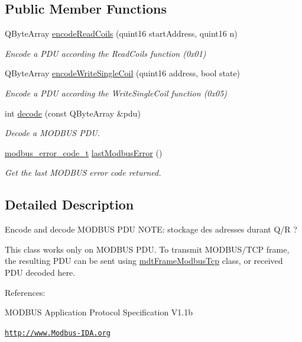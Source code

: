 \subsection*{Public Member Functions}
\begin{DoxyCompactItemize}
\item 
QByteArray \hyperlink{classmdt_frame_codec_modbus_adf0a4d583aeff7b818dda94514c594f0}{encodeReadCoils} (quint16 startAddress, quint16 n)
\begin{DoxyCompactList}\small\item\em Encode a PDU according the ReadCoils function (0x01) \end{DoxyCompactList}\item 
QByteArray \hyperlink{classmdt_frame_codec_modbus_a123f63422bb34fcb10ac653c0e89e79e}{encodeWriteSingleCoil} (quint16 address, bool state)
\begin{DoxyCompactList}\small\item\em Encode a PDU according the WriteSingleCoil function (0x05) \end{DoxyCompactList}\item 
int \hyperlink{classmdt_frame_codec_modbus_a426f465363a49d70890a462b40677787}{decode} (const QByteArray \&pdu)
\begin{DoxyCompactList}\small\item\em Decode a MODBUS PDU. \end{DoxyCompactList}\item 
\hyperlink{classmdt_frame_codec_modbus_a31d8291be7f8636d5d295ce3066d7ac7}{modbus\_\-error\_\-code\_\-t} \hyperlink{classmdt_frame_codec_modbus_a21f3102e12f1a1d9c4145c1ce1f8e6b6}{lastModbusError} ()
\begin{DoxyCompactList}\small\item\em Get the last MODBUS error code returned. \end{DoxyCompactList}\end{DoxyCompactItemize}


\subsection{Detailed Description}
Encode and decode MODBUS PDU NOTE: stockage des adresses durant Q/R ? 

This class works only on MODBUS PDU. To transmit MODBUS/TCP frame, the resulting PDU can be sent using \hyperlink{classmdt_frame_modbus_tcp}{mdtFrameModbusTcp} class, or received PDU decoded here.

References:
\begin{DoxyItemize}
\item MODBUS Application Protocol Specification V1.1b
\item \href{http://www.Modbus-IDA.org}{\tt http://www.Modbus-\/IDA.org}
\end{DoxyItemize}

